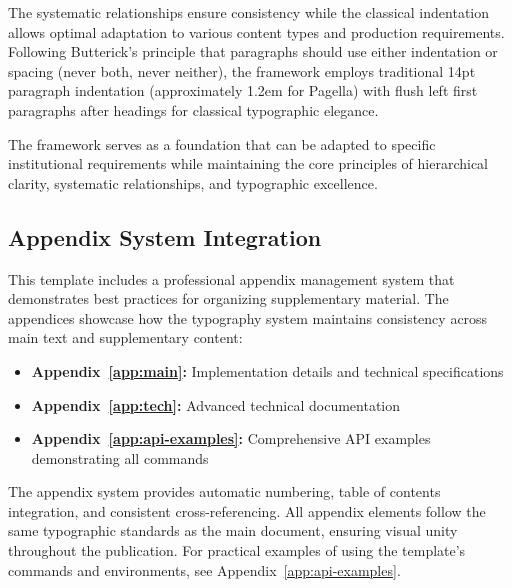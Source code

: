 \documentclass[11pt]{article}
\begin{document}
The systematic relationships ensure consistency while the classical indentation allows optimal adaptation to various content types and production requirements. Following Butterick's principle that paragraphs should use either indentation or spacing (never both, never neither), the framework employs traditional 14pt paragraph indentation (approximately 1.2em for Pagella) with flush left first paragraphs after headings for classical typographic elegance.

The framework serves as a foundation that can be adapted to specific institutional requirements while maintaining the core principles of hierarchical clarity, systematic relationships, and typographic excellence.

\subsection{Appendix System Integration}

This template includes a professional appendix management system that demonstrates best practices for organizing supplementary material.
The appendices showcase how the typography system maintains consistency across main text and supplementary content:

\begin{itemize}
  \item \textbf{Appendix~\ref{app:main}:} Implementation details and technical specifications
  \item \textbf{Appendix~\ref{app:tech}:} Advanced technical documentation
  \item \textbf{Appendix~\ref{app:api-examples}:} Comprehensive API examples demonstrating all commands
\end{itemize}

 The appendix system provides automatic numbering, table of contents integration, and consistent cross-referencing.
All appendix elements follow the same typographic standards as the main document, ensuring visual unity throughout the publication.
For practical examples of using the template's commands and environments, see Appendix~\ref{app:api-examples}.
\startappendices
  
  
  
\finishappendices

\printbibliography
\end{document}
